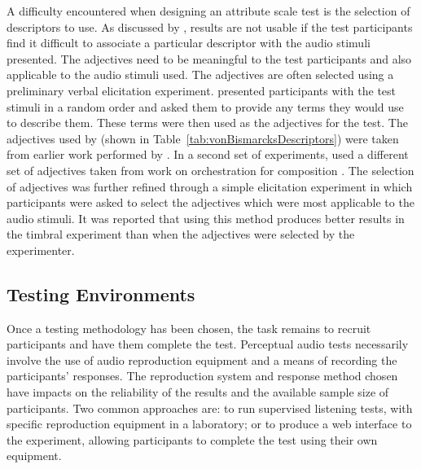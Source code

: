 			A difficulty encountered when designing an attribute scale test is the selection of descriptors to
			use. As discussed by \citet{darke2005assessment}, results are not usable if the test participants
			find it difficult to associate a particular descriptor with the audio stimuli presented. The
			adjectives need to be meaningful to the test participants and also applicable to the audio stimuli
			used. The adjectives are often selected using a preliminary verbal elicitation experiment.
			\citet{namba1991verbal} presented participants with the test stimuli in a random order and asked
			them to provide any terms they would use to describe them. These terms were then used as the
			adjectives for the test. The adjectives used by \citet{kendall1993verbal1} (shown in
			Table~\ref{tab:vonBismarcksDescriptors}) were taken from earlier work performed by
			\citet{vonbismarck1974timbre}. In a second set of experiments, \citet{kendall1993verbal2} used a
			different set of adjectives taken from work on orchestration for composition
			\citep{piston1955orchestration}. The selection of adjectives was further refined through a simple
			elicitation experiment in which participants were asked to select the adjectives which were most
			applicable to the audio stimuli. It was reported that using this method produces better results in
			the timbral experiment than when the adjectives were selected by the experimenter.

	\subsection{Testing Environments}
	\label{sec:Timbre-ListeningTests-Environments}
		Once a testing methodology has been chosen, the task remains to recruit participants and have them complete
		the test. Perceptual audio tests necessarily involve the use of audio reproduction equipment and a means of
		recording the participants' responses. The reproduction system and response method chosen have impacts on
		the reliability of the results and the available sample size of participants. Two common approaches are: to
		run supervised listening tests, with specific reproduction equipment in a laboratory; or to produce a web
		interface to the experiment, allowing participants to complete the test using their own equipment.

